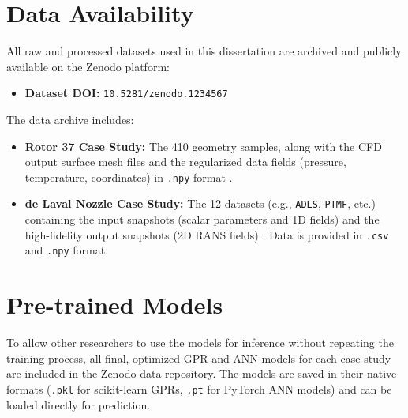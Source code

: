 \documentclass[dscexam, EN]{ufabcFHZh}
\begin{document}
\section{Data Availability}
\label{sec:data_availability}

All raw and processed datasets used in this dissertation are archived and publicly available on the Zenodo platform:
\begin{itemize}
    \item \textbf{Dataset DOI:} \texttt{10.5281/zenodo.1234567}
\end{itemize}
The data archive includes:
\begin{itemize}
    \item \textbf{Rotor 37 Case Study:} The 410 geometry samples, along with the CFD output surface mesh files and the regularized data fields (pressure, temperature, coordinates) in \texttt{.npy} format \cite{[1]}.
    \item \textbf{de Laval Nozzle Case Study:} The 12 datasets (e.g., \texttt{ADLS}, \texttt{PTMF}, etc.) containing the input snapshots (scalar parameters and 1D fields) and the high-fidelity output snapshots (2D RANS fields) \cite{[1]}. Data is provided in \texttt{.csv} and \texttt{.npy} format.
\end{itemize}

\section{Pre-trained Models}
\label{sec:models_availability}

To allow other researchers to use the models for inference without repeating the training process, all final, optimized GPR and ANN models for each case study are included in the Zenodo data repository. The models are saved in their native formats (\texttt{.pkl} for scikit-learn GPRs, \texttt{.pt} for PyTorch ANN models) and can be loaded directly for prediction.
\end{document}
